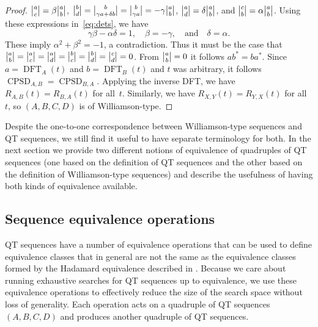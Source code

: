 \documentclass[12pt]{article}
\numberwithin{equation}{section}
\DeclareMathOperator{\CPSD}{CPSD}
\DeclareMathOperator{\DFT}{DFT}
\newcommand{\detii}{\genfrac{\lvert}{\rvert}{0pt}{}}
\begin{document}
\begin{proof}
$\detii{a}{c}=\beta\detii{a}{b}$, $\detii{b}{d}=\detii{b}{\gamma a + \delta b}=\detii{b}{\gamma a}=-\gamma\detii{a}{b}$,
$\detii{a}{d}=\delta\detii{a}{b}$, and $\detii{c}{b}=\alpha\detii{a}{b}$.  Using these expressions in~\eqref{eq:dets}, we have
\[ \gamma\beta-\alpha\delta = 1 , \quad \beta = - \gamma, \quad\text{and}\quad \delta = \alpha . \]
These imply $\alpha^2+\beta^2=-1$, a contradiction.  Thus it must be the case
that $\detii{a}{b}=\detii{a}{c}=\detii{a}{d}=\detii{b}{c}=\detii{b}{d}=\detii{c}{d}=0$.
From $\detii{a}{b}=0$ it follows $ab^*=ba^*$.  Since $a=\DFT_A(t)$ and $b=\DFT_B(t)$
and $t$ was arbitrary, it follows $\CPSD_{A,B}=\CPSD_{B,A}$.  Applying the inverse DFT, we have
$R_{A,B}(t)=R_{B,A}(t)$ for all~$t$.  Similarly, we have $R_{X,Y}(t)=R_{Y,X}(t)$ for all~$t$,
so $(A,B,C,D)$ is of Williamson-type.
\end{proof}

Despite the one-to-one correspondence between Williamson-type sequences and QT sequences, we still find it useful
to have separate terminology for both.  In the next section we
provide two different notions of equivalence of quadruples of QT sequences (one based 
on the definition of QT sequences and the other based on the definition of Williamson-type sequences)
and describe the usefulness of having both kinds of equivalence available.

\subsection{Sequence equivalence operations}\label{sec:equiv}

QT sequences have a number of equivalence operations that can be used to define equivalence classes 
that in general are not the same as the equivalence classes formed by the Hadamard equivalence described in .
Because we care about running exhaustive searches
for QT sequences up to equivalence, we use these equivalence operations to
effectively reduce the size of the search space without loss of generality.
Each operation acts on a quadruple of QT sequences $(A,B,C,D)$
and produces another quadruple of QT sequences.
\end{document}
